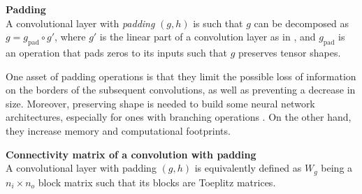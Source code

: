 \begin{definition}\textbf{Padding}\\
A convolutional layer with \emph{padding} $(g, h)$ is such that $g$ can be decomposed as $g = g_\text{pad} \circ g'$, where $g'$ is the linear part of a convolution layer as in , and $g_\text{pad}$ is an operation that pads zeros to its inputs such that $g$ preserves tensor shapes.
\end{definition}

\begin{remark}
One asset of padding operations is that they limit the possible loss of information on the borders of the subsequent convolutions, as well as preventing a decrease in size. Moreover, preserving shape is needed to build some neural network architectures, especially for ones with branching operations \eg {}. On the other hand, they increase memory and computational footprints.
\end{remark}

\begin{proposition}\textbf{Connectivity matrix of a convolution with padding}\\
A convolutional layer with padding $(g, h)$ is equivalently defined as $W_g$ being a $n_i \times n_o$ block matrix such that its blocks are Toeplitz matrices.
\end{proposition}

